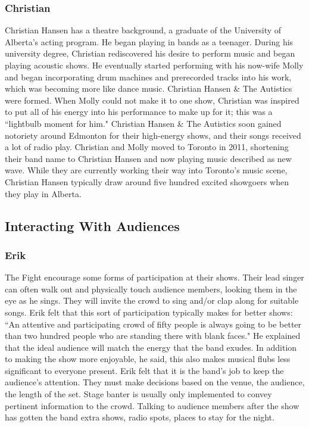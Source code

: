 \subsubsection{Christian}
Christian Hansen has a theatre background, a graduate of the University of Alberta's acting program. He began playing in bands as a teenager. During his university degree, Christian rediscovered his desire to perform music and began playing acoustic shows. He eventually started performing with his now-wife Molly and began incorporating drum machines and prerecorded tracks into his work, which was becoming more like dance music. Christian Hansen \& The Autistics were formed. When Molly could not make it to one show, Christian was inspired to put all of his energy into his performance to make up for it; this was a ``lightbulb moment for him." Christian Hansen \& The Autistics soon gained notoriety around Edmonton for their high-energy shows, and their songs received a lot of radio play. Christian and Molly moved to Toronto in 2011, shortening their band name to Christian Hansen and now playing music described as new wave. While they are currently working their way into Toronto's music scene, Christian Hansen typically draw around five hundred excited showgoers when they play in Alberta.

\subsection{Interacting With Audiences}

\subsubsection{Erik}
The Fight encourage some forms of participation at their shows. Their lead singer can often walk out and physically touch audience members, looking them in the eye as he sings. They will invite the crowd to sing and/or clap along for suitable songs. Erik felt that this sort of participation typically makes for better shows: ``An attentive and participating crowd of fifty people is always going to be better than two hundred people who are standing there with blank faces." He explained that the ideal audience will match the energy that the band exudes. In addition to making the show more enjoyable, he said, this also makes musical flubs less significant to everyone present. Erik felt that it is the band's job to keep the audience's attention. They must make decisions based on the venue, the audience, the length of the set. Stage banter is usually only implemented to convey pertinent information to the crowd. Talking to audience members after the show has gotten the band extra shows, radio spots, places to stay for the night.

